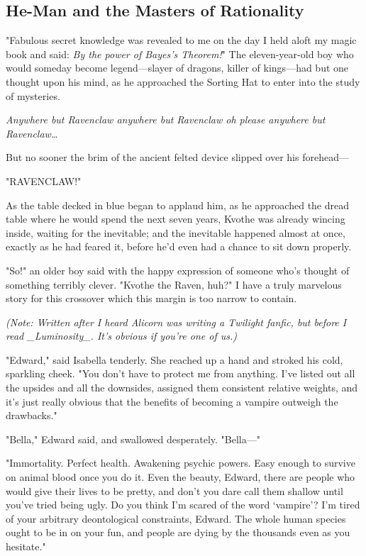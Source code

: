 \subsection{He-Man and the Masters of Rationality}

"Fabulous secret knowledge was revealed to me on the day I held aloft my magic 
book and said: \emph{By the power of Bayes's Theorem!}"
\sbreak
The eleven-year-old boy who would someday become legend---slayer of dragons, 
killer of kings---had but one thought upon his mind, as he approached the 
Sorting Hat to enter into the study of mysteries.

\emph{Anywhere but Ravenclaw anywhere but Ravenclaw oh please anywhere but 
Ravenclaw{\ldots}}

But no sooner the brim of the ancient felted device slipped over his forehead---

"RAVENCLAW!"

As the table decked in blue began to applaud him, as he approached the dread 
table where he would spend the next seven years, Kvothe was already wincing 
inside, waiting for the inevitable; and the inevitable happened almost at once, 
exactly as he had feared it, before he'd even had a chance to sit down properly.

"So!" an older boy said with the happy expression of someone who's thought of 
something terribly clever. "Kvothe the Raven, huh?"
\sbreak
I have a truly marvelous story for this crossover which this margin is too 
narrow to contain.
\sbreak

\emph{(Note: Written after I heard Alicorn was writing a Twilight fanfic, but 
before I read \_Luminosity\_. It's obvious if you're one of us.)}

\noindent{}"Edward," said Isabella tenderly. She reached up a hand and stroked his cold, 
sparkling cheek. "You don't have to protect me from anything. I've listed out 
all the upsides and all the downsides, assigned them consistent relative 
weights, and it's just really obvious that the benefits of becoming a vampire 
outweigh the drawbacks."

"Bella," Edward said, and swallowed desperately. "Bella---"

"Immortality. Perfect health. Awakening psychic powers. Easy enough to survive 
on animal blood once you do it. Even the beauty, Edward, there are people who 
would give their lives to be pretty, and don't you dare call them shallow until 
you've tried being ugly. Do you think I'm scared of the word `vampire'? I'm 
tired of your arbitrary deontological constraints, Edward. The whole human 
species ought to be in on your fun, and people are dying by the thousands even 
as you hesitate."

